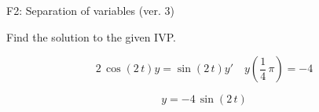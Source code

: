\begin{exercise}
  \begin{exerciseTitle}F2: Separation of variables (ver. 3)\end{exerciseTitle}
  \begin{exerciseStatement}
    
Find the solution to the given IVP.

    
\[2 \, \cos\left(2 \, t\right) y= \sin\left(2 \, t\right) y'\hspace{1em} y\left( \frac{1}{4} \, \pi \right)= -4\]

  \end{exerciseStatement}
  \begin{exerciseAnswer}
    
\[y= -4 \, \sin\left(2 \, t\right)\]

  \end{exerciseAnswer}
\end{exercise}